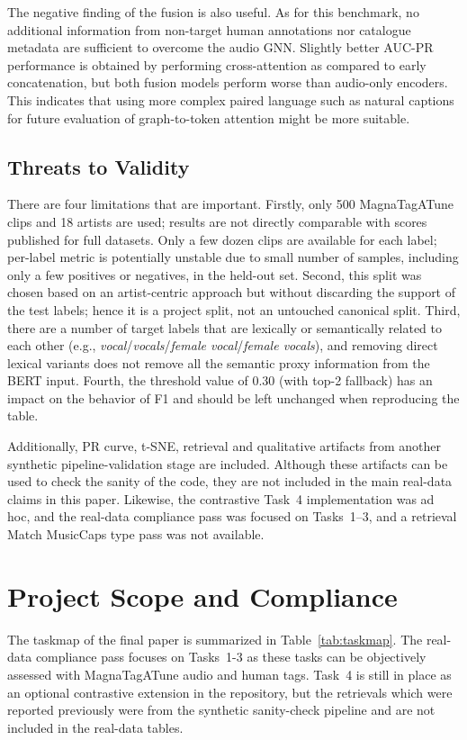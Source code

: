 \documentclass[conference]{IEEEtran}
\begin{document}
The negative finding of the fusion is also useful. As for this benchmark, no additional information from non-target human annotations nor catalogue metadata are sufficient to overcome the audio GNN. Slightly better AUC-PR performance is obtained by performing cross-attention as compared to early concatenation, but both fusion models perform worse than audio-only encoders. This indicates that using more complex paired language such as natural captions for future evaluation of graph-to-token attention might be more suitable.

\subsection{Threats to Validity}
There are four limitations that are important. Firstly, only 500 MagnaTagATune clips and 18 artists are used; results are not directly comparable with scores published for full datasets. Only a few dozen clips are available for each label; per-label metric is potentially unstable due to small number of samples, including only a few positives or negatives, in the held-out set. Second, this split was chosen based on an artist-centric approach but without discarding the support of the test labels; hence it is a project split, not an untouched canonical split. Third, there are a number of target labels that are lexically or semantically related to each other (e.g., \emph{vocal}/\emph{vocals}/\emph{female vocal}/\emph{female vocals}), and removing direct lexical variants does not remove all the semantic proxy information from the BERT input. Fourth, the threshold value of 0.30 (with top-2 fallback) has an impact on the behavior of F1 and should be left unchanged when reproducing the table.

Additionally, PR curve, t-SNE, retrieval and qualitative artifacts from another synthetic pipeline-validation stage are included. Although these artifacts can be used to check the sanity of the code, they are not included in the main real-data claims in this paper. Likewise, the contrastive Task~4 implementation was ad hoc, and the real-data compliance pass was focused on Tasks~1--3, and a retrieval Match MusicCaps type pass was not available.


\section{Project Scope and Compliance}
The taskmap of the final paper is summarized in Table~\ref{tab:taskmap}. The real-data compliance pass focuses on Tasks~1-3 as these tasks can be objectively assessed with MagnaTagATune audio and human tags. Task~4 is still in place as an optional contrastive extension in the repository, but the retrievals which were reported previously were from the synthetic sanity-check pipeline and are not included in the real-data tables.
\end{document}
